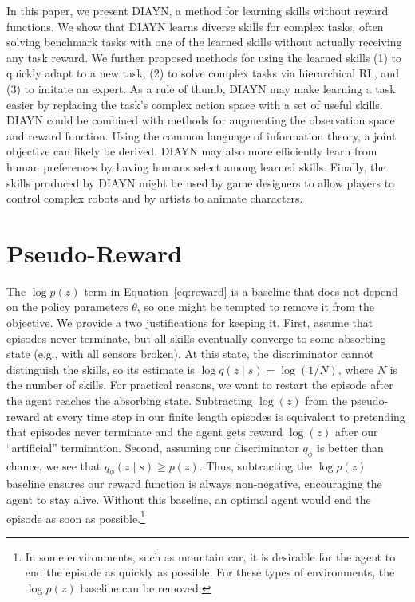 \documentclass{article} %
\theoremstyle{questionstyle}\newtheorem{question}{Question}
\begin{document}
In this paper, we present DIAYN, a method for learning skills without reward functions. We show that DIAYN learns diverse skills for complex tasks, often solving benchmark tasks with one of the learned skills without actually receiving any task reward. We further proposed methods for using the learned skills (1) to quickly adapt to a new task, (2) to solve complex tasks via hierarchical RL, and (3) to imitate an expert.
As a rule of thumb, DIAYN may make learning a task easier by replacing the task's complex action space with a set of useful skills. 
DIAYN could be combined with methods for augmenting the observation space and reward function. Using the common language of information theory, a joint objective can likely be derived.
DIAYN may also more efficiently learn from human preferences by having humans select among learned skills.
Finally, the skills produced by DIAYN might be used by game designers to allow players to control complex robots and by artists to animate characters.

{ \small


}

\clearpage
\appendix


\section{Pseudo-Reward}
\label{appendix:pseudo-reward}
The $\log p(z)$ term in Equation~\ref{eq:reward} is a baseline that does not depend on the policy parameters $\theta$, so one might be tempted to remove it from the objective. We provide a two justifications for keeping it.
First, assume that episodes never terminate, but all skills eventually converge to some absorbing state (e.g., with all sensors broken). At this state, the discriminator cannot distinguish the skills, so its estimate is $\log q(z \mid s) = \log(1/N)$, where $N$ is the number of skills. For practical reasons, we want to restart the episode after the agent reaches the absorbing state. Subtracting $\log(z)$ from the pseudo-reward at every time step in our finite length episodes is equivalent to pretending that episodes never terminate and the agent gets reward $\log(z)$ after our ``artificial'' termination.
Second, assuming our discriminator $q_{\phi}$ is better than chance, we see that $q_{\phi}(z \mid s) \ge p(z)$. Thus, subtracting the $\log p(z)$ baseline ensures our reward function is always non-negative, encouraging the agent to stay alive. Without this baseline, an optimal agent would end the episode as soon as possible.\footnote{In some environments, such as mountain car, it is desirable for the agent to end the episode as quickly as possible. For these types of environments, the $\log p(z)$ baseline can be removed.}
\end{document}
